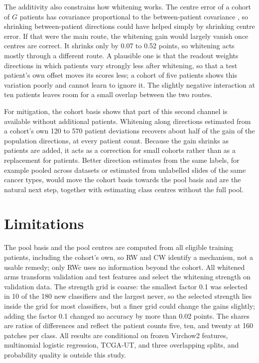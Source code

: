 \documentclass[11pt]{article}
\begin{document}
The additivity also constrains how whitening works. The centre error of a cohort of $G$ patients has covariance proportional to the between-patient covariance \citep{queisler2026centreError}, so shrinking between-patient directions could have helped simply by shrinking centre error. If that were the main route, the whitening gain would largely vanish once centres are correct. It shrinks only by 0.07 to 0.52 points, so whitening acts mostly through a different route. A plausible one is that the readout weights directions in which patients vary strongly less after whitening, so that a test patient's own offset moves its scores less; a cohort of five patients shows this variation poorly and cannot learn to ignore it. The slightly negative interaction at ten patients leaves room for a small overlap between the two routes.

For mitigation, the cohort basis shows that part of this second channel is available without additional patients. Whitening along directions estimated from a cohort's own 120 to 570 patient deviations recovers about half of the gain of the population directions, at every patient count. Because the gain shrinks as patients are added, it acts as a correction for small cohorts rather than as a replacement for patients. Better direction estimates from the same labels, for example pooled across datasets or estimated from unlabelled slides of the same cancer types, would move the cohort basis towards the pool basis and are the natural next step, together with estimating class centres without the full pool.

\section{Limitations}
\label{sec:limitations}
The pool basis and the pool centres are computed from all eligible training patients, including the cohort's own, so RW and CW identify a mechanism, not a usable remedy; only RWc uses no information beyond the cohort. All whitened arms transform validation and test features and select the whitening strength on validation data. The strength grid is coarse: the smallest factor 0.1 was selected in 10 of the 180 new classifiers and the largest never, so the selected strength lies inside the grid for most classifiers, but a finer grid could change the gains slightly; adding the factor 0.1 changed no accuracy by more than 0.02 points. The shares are ratios of differences and reflect the patient counts five, ten, and twenty at 160 patches per class. All results are conditional on frozen Virchow2 features, multinomial logistic regression, TCGA-UT, and three overlapping splits, and probability quality is outside this study.



\end{document}
